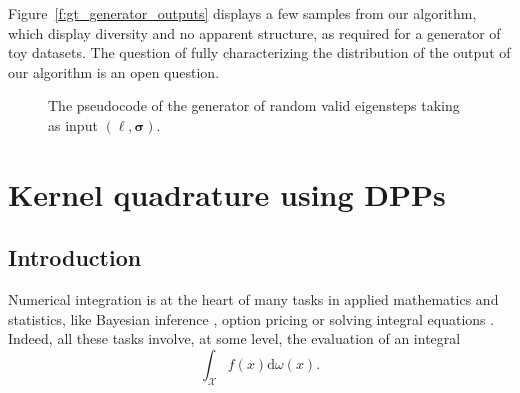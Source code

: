 \documentclass[twoside,11pt]{book}
\numberwithin{theorem}{chapter}
\numberwithin{definition}{chapter}
\numberwithin{proposition}{chapter}
\numberwithin{corollary}{chapter}
\numberwithin{example}{chapter}
\numberwithin{lemma}{chapter}
\numberwithin{assumption}{chapter}
\begin{document}

Figure~\ref{f:gt_generator_outputs} displays a few samples from our algorithm, which display diversity and no apparent structure, as required for a generator of toy datasets. The question of fully characterizing the distribution of the output of our algorithm is an open question.

\begin{figure}
\centerline{
}
\caption{The pseudocode of the generator of random valid eigensteps taking as input $(\bm{\ell},\bm{\sigma})$.}
\label{f:Algo_Random_Eigensteps}
\end{figure}

\chapter{Kernel quadrature using DPPs}\label{chap:dppkq}
\section{Introduction}
Numerical integration is at the heart of many tasks in applied mathematics and statistics, like Bayesian inference \citep{RoCa04}, option pricing \citep{Gla13} or solving integral equations \citep{KrMaKo89}. Indeed, all these tasks involve, at some level, the evaluation of an integral
\begin{equation}\label{eq:general_integral_formula}
\int_{\mathcal{X}}f(x)\mathrm{d}\omega(x).
\end{equation}
\end{document}
